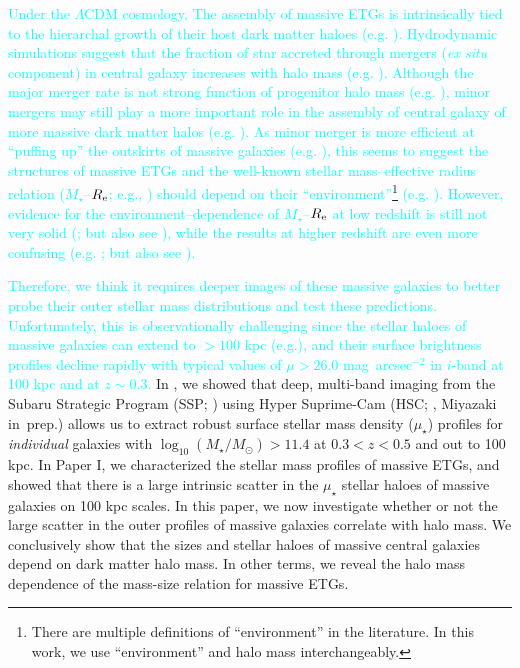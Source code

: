 \documentclass[a4paper,fleqn,usenatbib]{mnras}
\def\sb{mag~arcsec$^{-2}$}
\def\mstar{{$M_{\star}$}}
\def\logms{{$\log_{10} (M_{\star}/M_{\odot})$}}
\def\mden{{$\mu_{\star}$}}
\newcommand{\song}[1]{\textcolor{cyan}{#1}}
\begin{document}
    \song{
    Under the $\Lambda$CDM cosmology, The assembly of massive ETGs is intrinsically 
    tied to the hierarchal growth of their host dark matter haloes 
    (e.g. \citealt{Leauthaud2012, Behroozi2013, Shankar2013}). 
    Hydrodynamic simulations suggest that the fraction of star accreted through 
    mergers (\textit{ex situ} component) in central galaxy increases with halo 
    mass (e.g. \citealt{Pillepich2017b}). 
    Although the major merger rate is not strong function of progenitor halo mass 
    (e.g. \citealt{Shankar2015}), minor mergers may still play a more important 
    role in the assembly of central galaxy of more massive dark matter halos 
    (e.g. \citealt{Guo2011, Yoon2017}). 
    As minor merger is more efficient at ``puffing up'' the outskirts of massive 
    galaxies (e.g. \citealt{Oogi2013, Bedorf2013}), this seems to suggest the 
    structures of massive ETGs and the well-known stellar mass--effective radius 
    relation (\mstar{}--$R_{\rm e}$; e.g., \citealt{Shen2003, Guo2009}) should depend 
    on their ``environment''\footnote{There are multiple definitions of 
    ``environment'' in the literature.  
    In this work, we use ``environment'' and halo mass interchangeably.}
    (e.g. \citealt{Shankar2013, Shankar2014}). 
    However, evidence for the environment--dependence of \mstar{}--$R_{\rm e}$
    at low redshift is still not very solid (\citealt{Nair2010, HCompany13}; 
    but also see \citealt{Yoon2017}), while the results at higher redshift are 
    even more confusing (e.g. \citealt{Papovich2012, Lani2013, Delaye2014}; but 
    also see \citealt{Rettura2010}).
    }
	
	\song{
    Therefore, we think it requires deeper images of these massive galaxies to 
    better probe their outer stellar mass distributions and test these 
    predictions. 
    Unfortunately, this is observationally challenging since the stellar haloes 
    of massive galaxies can extend to $>100$ kpc (e.g.\citealt{Tal2011, DSouza2014}),
    and their surface brightness profiles decline rapidly with typical values of 
    $\mu > 26.0$ \sb{} in $i$-band at 100 kpc and at $z\sim0.3$. 
    }
    In \citet[][Paper I hereafter]{hscMassiveI}, we showed that deep, 
    multi-band imaging from the Subaru Strategic Program (SSP; \citealt{HSC-SSP,
    HSC-DR1}) using Hyper Suprime-Cam (HSC; \citealt{Miyazaki2012}, 
    Miyazaki in~prep.) allows us to extract robust surface stellar
    mass density (\mden{}) profiles for {\it individual} galaxies with 
    \logms{}$>11.4$ at $0.3 < z < 0.5$ and out to 100 kpc. 
    In Paper I, we characterized the stellar mass profiles of massive ETGs, and 
    showed that there is a large intrinsic scatter in the \mden{} stellar haloes of
    massive galaxies on 100 kpc scales. 
    In this paper, we now investigate whether or not the large scatter in the outer 
    profiles of massive galaxies correlate with halo mass. 
    We conclusively show that the sizes and stellar haloes of massive central galaxies 
    depend on dark matter halo mass. 
    In other terms, we reveal the halo mass dependence of the mass-size relation 
    for massive ETGs.   
    
\end{document}
